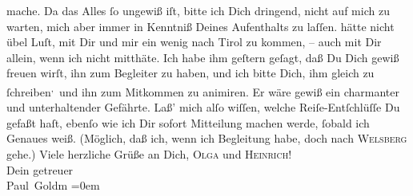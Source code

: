 \begin{ledgroupsized}[t]{13cm}
               mache. Da das Alles ſo ungewiß iſt, bitte ich Dich dringend, nicht auf mich zu
               warten, mich aber immer in Kenntniß Deines Aufenthalts {\pb}zu laſſen.\pend
           \pstart
           \label{K_L03379-3v}\label{K_L03379-3h} hätte nicht übel
               Luſt, mit Dir und mir ein wenig nach Tirol zu kommen, – auch mit Dir allein, wenn ich nicht mitthäte. Ich habe
               ihm geſtern geſagt, daß Du Dich gewiß freuen wirſt,
               ihn zum Begleiter zu haben, und ich bitte Dich, ihm gleich zu ſchreiben\substVorne{}\textsuperscript{,}\substDazwischen{} und\substHinten{} ihn zum Mitkommen zu animiren. Er wäre gewiß ein charmanter und
               unterhaltender Gefährte.\pend
           \pstart
           Laß’ mich alſo wiſſen, {\pb}welche Reiſe-Entſchlüſſe Du
               gefaßt haſt, ebenſo wie ich Dir sofort Mitteilung machen werde, ſobald ich Genaues
               weiß. (Möglich, daß ich, wenn ich Begleitung habe, doch nach \textsc{Welsberg} gehe.)\pend
           \pstart
           Viele herzliche Grüße an Dich, \textsc{Olga} und \textsc{Heinrich}! {\\[\baselineskip]}Dein getreuer {\\[\baselineskip]}\spacefill\mbox{Paul Goldm}\pend
           \leftskip=0em{}
         
         \endnumbering{}\end{ledgroupsized}  \newcommand{\dateiname}{L03379}\newcommand{\titel}{Paul Goldmann an Arthur Schnitzler, 31. 7. [1903]}\newcommand{\editorInnen}{Martin Anton Müller und Laura Untner}
      